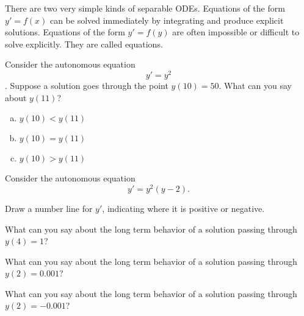 \begin{applicationActivities}

\begin{observation}
There are two very simple kinds of separable ODEs.
\vfill
Equations of the form \(y'=f(x)\) can be solved immediately by integrating and produce explicit solutions.
\vfill
Equations of the form \(y'=f(y)\) are often impossible or difficult to solve explicitly.  They are called  equations.
\end{observation}

\begin{activity}{10}
Consider the autonomous equation \[y'=y^2\].
\vfill
Suppose a solution goes through the point \(y(10)=50 \).  What can you say about \(y(11)\)?
\vfill
\begin{enumerate}[(a)]
\item \(y(10)<y(11)\)
\item \(y(10)=y(11)\)
\item \(y(10)>y(11)\)
\end{enumerate}
\end{activity}

\begin{activity}{10}
Consider the autonomous equation \[y'=y^2(y-2).\]

\begin{subactivity}
Draw a number line for \(y'\), indicating where it is positive or negative.
\end{subactivity}
\begin{subactivity}
What can you say about the long term behavior of a solution passing through \(y(4)=1\)?
\end{subactivity}
\begin{subactivity}
What can you say about the long term behavior of a solution passing through \(y(2)=0.001\)?
\end{subactivity}
\begin{subactivity}
What can you say about the long term behavior of a solution passing through \(y(2)=-0.001\)?
\end{subactivity}
\end{activity}

\end{applicationActivities}

